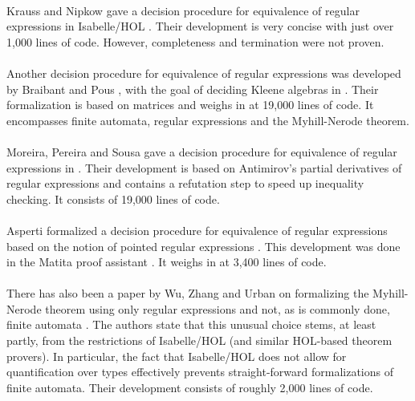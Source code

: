 \paragraph{}
Krauss and Nipkow gave a decision procedure for equivalence of regular expressions in Isabelle/HOL \cite{DBLP:journals/jar/KraussN12}. Their development is very concise with just over 1,000 lines of code. However, completeness and termination were not proven.

\paragraph{}
Another decision procedure for equivalence of regular expressions was developed by Braibant and Pous \cite{DBLP:journals/corr/abs-1105-4537}, with the goal of deciding Kleene algebras in \coq. Their formalization is based on matrices and weighs in at 19,000 lines of code. It encompasses finite automata, regular expressions and the Myhill-Nerode theorem.

\paragraph{}
Moreira, Pereira and Sousa gave a decision procedure for equivalence of regular expressions in \coq \cite{DBLP:conf/RelMiCS/MoreiraPS12}.
Their development is based on Antimirov's partial derivatives of regular expressions \cite{DBLP:journals/tcs/Antimirov96} and contains a refutation step to speed up inequality checking. It consists of 19,000 lines of code.

\paragraph{}
Asperti formalized a decision procedure for equivalence of regular expressions \cite{DBLP:conf/itp/Asperti12} based on the notion of pointed regular expressions \cite{DBLP:journals/corr/abs-1010-2604}. This development was done in the Matita proof assistant \cite{DBLP:conf/cade/AspertiRCT11}. It weighs in at 3,400 lines of code.

\paragraph{}
There has also been a paper by Wu, Zhang and Urban on formalizing the Myhill-Nerode theorem using only regular expressions and not, as is commonly done, finite automata \cite{DBLP:conf/itp/WuZU11}.
The authors state that this unusual choice stems, at least partly, from the restrictions of Isabelle/HOL (and similar HOL-based theorem provers). 
In particular, the fact that Isabelle/HOL does not allow for quantification over types effectively prevents straight-forward formalizations of finite automata.
Their development consists of roughly 2,000 lines of code.



